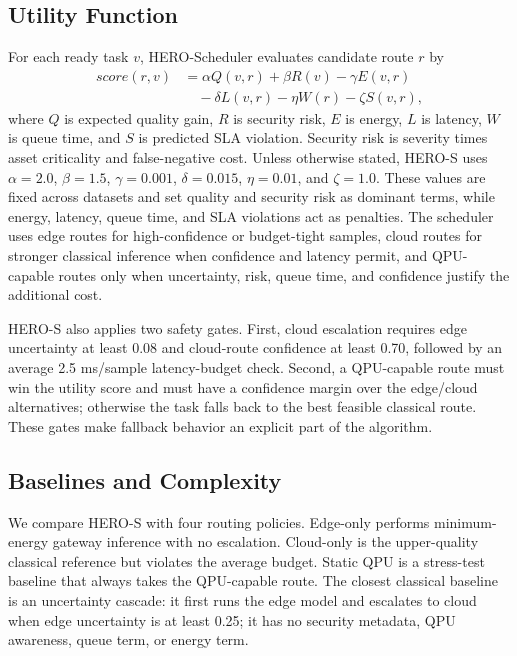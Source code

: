 \documentclass[conference]{IEEEtran}
\begin{document}
\subsection{Utility Function}
For each ready task $v$, HERO-Scheduler evaluates candidate route $r$ by
\begin{equation}
\begin{split}
score(r,v) &= \alpha Q(v,r) + \beta R(v) - \gamma E(v,r) \\
&\quad - \delta L(v,r) - \eta W(r) - \zeta S(v,r),
\end{split}
\end{equation}
where $Q$ is expected quality gain, $R$ is security risk, $E$ is energy, $L$ is latency, $W$ is queue time, and $S$ is predicted SLA violation. Security risk is severity times asset criticality and false-negative cost. Unless otherwise stated, HERO-S uses $\alpha=2.0$, $\beta=1.5$, $\gamma=0.001$, $\delta=0.015$, $\eta=0.01$, and $\zeta=1.0$. These values are fixed across datasets and set quality and security risk as dominant terms, while energy, latency, queue time, and SLA violations act as penalties. The scheduler uses edge routes for high-confidence or budget-tight samples, cloud routes for stronger classical inference when confidence and latency permit, and QPU-capable routes only when uncertainty, risk, queue time, and confidence justify the additional cost.

HERO-S also applies two safety gates. First, cloud escalation requires edge uncertainty at least 0.08 and cloud-route confidence at least 0.70, followed by an average 2.5 ms/sample latency-budget check. Second, a QPU-capable route must win the utility score and must have a confidence margin over the edge/cloud alternatives; otherwise the task falls back to the best feasible classical route. These gates make fallback behavior an explicit part of the algorithm.

\subsection{Baselines and Complexity}
We compare HERO-S with four routing policies. Edge-only performs minimum-energy gateway inference with no escalation. Cloud-only is the upper-quality classical reference but violates the average budget. Static QPU is a stress-test baseline that always takes the QPU-capable route. The closest classical baseline is an uncertainty cascade: it first runs the edge model and escalates to cloud when edge uncertainty is at least 0.25; it has no security metadata, QPU awareness, queue term, or energy term.
\end{document}
